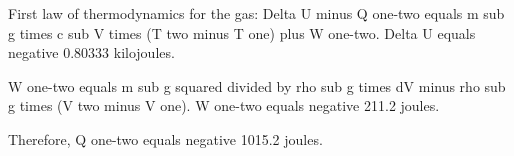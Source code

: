 First law of thermodynamics for the gas:  
Delta U minus Q one-two equals m sub g times c sub V times (T two minus T one) plus W one-two.  
Delta U equals negative 0.80333 kilojoules.  

W one-two equals m sub g squared divided by rho sub g times dV minus rho sub g times (V two minus V one).  
W one-two equals negative 211.2 joules.  

Therefore, Q one-two equals negative 1015.2 joules.